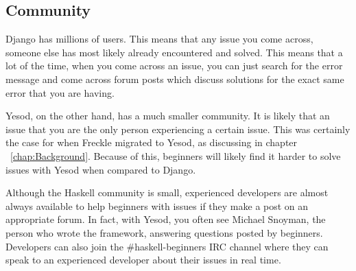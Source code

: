 \subsection{Community}

Django has millions of users. This means that any issue you come across,
someone else has most likely already encountered and solved. This means that
a lot of the time, when you come across an issue, you can just search for
the error message and come across forum posts which discuss solutions
for the exact same error that you are having.

Yesod, on the other hand, has a much smaller community. It is likely that
an issue that you are the only person experiencing a certain issue. This
was certainly the case for when Freckle migrated to Yesod, as discussing in
chapter ~\ref{chap:Background}. Because of this, beginners will likely find it
harder to solve issues with Yesod when compared to Django.

Although the Haskell community is small, experienced developers are almost always
available to help beginners with issues if they make a post on an appropriate
forum. In fact, with Yesod, you often see Michael Snoyman, the person who wrote
the framework, answering questions posted by beginners. Developers can also
join the \#haskell-beginners IRC channel where they can speak to an experienced
developer about their issues in real time.

